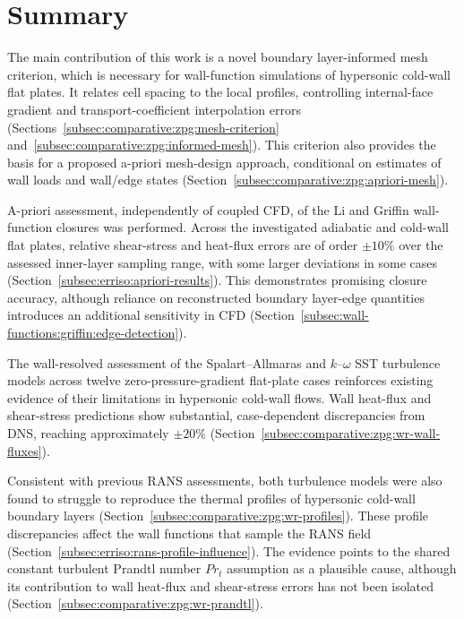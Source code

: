 \section{Summary}

The main contribution of this work is a novel boundary layer-informed mesh criterion, which is necessary for wall-function simulations of hypersonic cold-wall flat plates. It relates cell spacing to the local profiles, controlling internal-face gradient and transport-coefficient interpolation errors (Sections~\ref{subsec:comparative:zpg:mesh-criterion} and~\ref{subsec:comparative:zpg:informed-mesh}). This criterion also provides the basis for a proposed a-priori mesh-design approach, conditional on estimates of wall loads and wall/edge states (Section~\ref{subsec:comparative:zpg:apriori-mesh}).
\par\medskip

A-priori assessment, independently of coupled CFD, of the Li and Griffin wall-function closures was performed. Across the investigated adiabatic and cold-wall flat plates, relative shear-stress and heat-flux errors are of order \(\pm 10\%\) over the assessed inner-layer sampling range, with some larger deviations in some cases (Section~\ref{subsec:erriso:apriori-results}). This demonstrates promising closure accuracy, although reliance on reconstructed boundary layer-edge quantities introduces an additional sensitivity in CFD (Section~\ref{subsec:wall-functions:griffin:edge-detection}).
\par\medskip

The wall-resolved assessment of the Spalart--Allmaras and \(k\)--\(\omega\) SST turbulence models across twelve zero-pressure-gradient flat-plate cases reinforces existing evidence of their limitations in hypersonic cold-wall flows. Wall heat-flux and shear-stress predictions show substantial, case-dependent discrepancies from DNS, reaching approximately \(\pm 20\%\) (Section~\ref{subsec:comparative:zpg:wr-wall-fluxes}).
\par\medskip

Consistent with previous RANS assessments, both turbulence models were also found to struggle to reproduce the thermal profiles of hypersonic cold-wall boundary layers (Section~\ref{subsec:comparative:zpg:wr-profiles}). These profile discrepancies affect the wall functions that sample the RANS field (Section~\ref{subsec:erriso:rans-profile-influence}). The evidence points to the shared constant turbulent Prandtl number \(Pr_t\) assumption as a plausible cause, although its contribution to wall heat-flux and shear-stress errors has not been isolated (Section~\ref{subsec:comparative:zpg:wr-prandtl}).
\par\medskip

